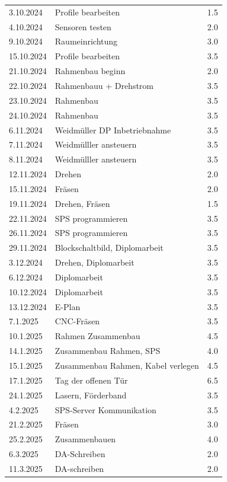 \begin{longtable}{|l|p{10cm}|r|}
    3.10.2024	&	Profile bearbeiten	&	1.5\\
    4.10.2024	&	Sensoren testen	&	2.0\\
    9.10.2024	&	Raumeinrichtung	&	3.0\\
    15.10.2024	&	Profile bearbeiten	&	3.5\\
    21.10.2024	&	Rahmenbau beginn	&	2.0\\
    22.10.2024	&	Rahmenbauu + Drehstrom	&	3.5\\
    23.10.2024	&	Rahmenbau	&	3.5\\
    24.10.2024	&	Rahmenbau	&	3.5\\
    6.11.2024	&	Weidmüller DP Inbetriebnahme	&	3.5\\
    7.11.2024	&	Weidmülller ansteuern	&	3.5\\
    8.11.2024	&	Weidmülller ansteuern	&	3.5\\
    12.11.2024	&	Drehen	&	2.0\\
    15.11.2024	&	Fräsen	&	2.0\\
    19.11.2024	&	Drehen, Fräsen	&	1.5\\
    22.11.2024	&	SPS programmieren	&	3.5\\
    26.11.2024	&	SPS programmieren	&	3.5\\
    29.11.2024	&	Blockschaltbild, Diplomarbeit	&	3.5\\
    3.12.2024	&	Drehen, Diplomarbeit	&	3.5\\
    6.12.2024	&   Diplomarbeit	&	3.5\\
    10.12.2024	&	Diplomarbeit	&	3.5\\
    13.12.2024	&	E-Plan 	&	3.5\\
    7.1.2025	&	CNC-Fräsen	&	3.5\\
    10.1.2025	&	Rahmen Zusammenbau	&	4.5\\
    14.1.2025	&	Zusammenbau Rahmen, SPS	&	4.0\\
    15.1.2025	&	Zusammenbau Rahmen, Kabel verlegen	&	4.5\\
    17.1.2025	&	Tag der offenen Tür	&	6.5\\
    24.1.2025	&	Lasern, Förderband  &	3.5\\
    4.2.2025	&	SPS-Server Kommunikation	&	3.5\\
    21.2.2025	&   Fräsen	&	3.0\\
    25.2.2025	&	Zusammenbauen	&	4.0\\
    6.3.2025	&	DA-Schreiben	&	2.0\\
    11.3.2025	&	DA-schreiben	&	2.0\\

\end{longtable}
